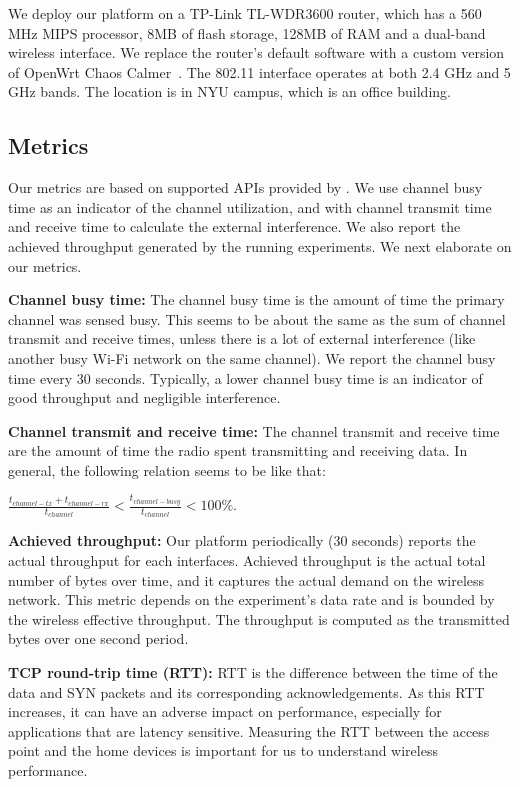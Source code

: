 We deploy our platform on a TP-Link TL-WDR3600 router, which has a 560 MHz MIPS processor, 8MB of flash storage, 128MB of RAM and a dual-band wireless interface. We replace the router's default software with a custom version of OpenWrt Chaos Calmer~\cite{openwrt}. The 802.11 interface operates at both 2.4 GHz and 5 GHz bands. The location is in NYU campus, which is an office building. 

\subsection{Metrics}
\label{ssec.metrics}

Our metrics are based on supported APIs provided by \sysname. We use channel busy time as an indicator of the channel utilization, and with channel transmit time and receive time to calculate the external interference. We also report the achieved throughput generated by the running experiments. We next elaborate on our metrics.

\textbf{Channel busy time:} The channel busy time is the amount of time the primary channel was sensed busy. This seems to be about the same as the sum of channel transmit and receive times, unless there is a lot of external interference (like another busy Wi-Fi network on the same channel).\cite{channelsurvey} We report the channel busy time every 30 seconds. Typically, a lower channel busy time is an indicator of good throughput and negligible interference.

\textbf{Channel transmit and receive time:} The channel transmit and receive time are the amount of time the radio spent transmitting and receiving data. In general, the following relation seems to be like that: 

\(\frac{t_{channel-tx} + t_{channel-rx}}{t_{channel}} < \frac{t_{channel-busy}}{t_{channel}} < 100\%\).

\textbf{Achieved throughput:} Our platform periodically (30 seconds) reports the actual throughput for each interfaces. Achieved throughput is the actual total number of bytes over time, and it captures the actual demand on the wireless network. This metric depends on the experiment's data rate and is bounded by the wireless effective throughput. The throughput is computed as the transmitted bytes over one second period.

\textbf{TCP round-trip time (RTT):} RTT is the difference between the time of the data and SYN packets and its corresponding acknowledgements. As this RTT increases, it can have an adverse impact on performance, especially for applications that are latency sensitive. Measuring the RTT between the access point and the home devices is important for us to understand wireless performance.

